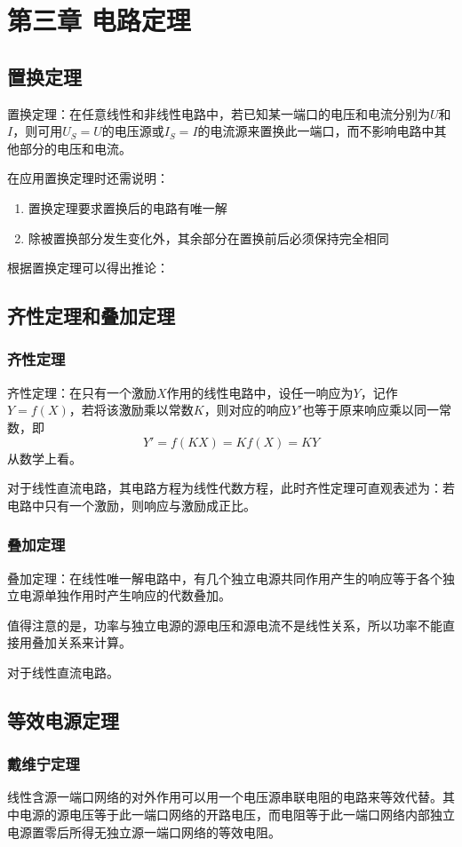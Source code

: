 \chapter{第三章 电路定理}

\section{置换定理}
置换定理：在任意线性和非线性电路中，若已知某一端口的电压和电流分别为$U$和$I$，则可用$U_S=U$的电压源或$I_S=I$的电流源来置换此一端口，而不影响电路中其他部分的电压和电流。

在应用置换定理时还需说明：
\begin{enumerate}
    \item 置换定理要求置换后的电路有唯一解
    \item 除被置换部分发生变化外，其余部分在置换前后必须保持完全相同
\end{enumerate}
根据置换定理可以得出推论：

\section{齐性定理和叠加定理}
\subsection{齐性定理}
齐性定理：在只有一个激励$X$作用的线性电路中，设任一响应为$Y$，记作$Y=f(X)$，若将该激励乘以常数$K$，则对应的响应$Y'$也等于原来响应乘以同一常数，即
\[
Y'=f(KX)=Kf(X)=KY
\]
从数学上看。

对于线性直流电路，其电路方程为线性代数方程，此时齐性定理可直观表述为：若电路中只有一个激励，则响应与激励成正比。

\subsection{叠加定理}
叠加定理：在线性唯一解电路中，有几个独立电源共同作用产生的响应等于各个独立电源单独作用时产生响应的代数叠加。

值得注意的是，功率与独立电源的源电压和源电流不是线性关系，所以功率不能直接用叠加关系来计算。

对于线性直流电路。

\section{等效电源定理}
\subsection{戴维宁定理}
线性含源一端口网络的对外作用可以用一个电压源串联电阻的电路来等效代替。其中电源的源电压等于此一端口网络的开路电压，而电阻等于此一端口网络内部独立电源置零后所得无独立源一端口网络的等效电阻。


